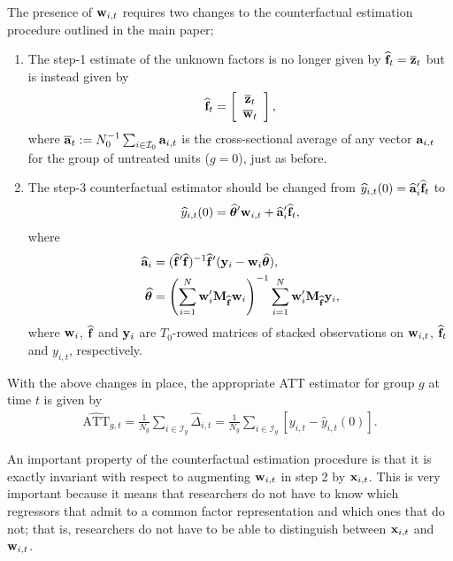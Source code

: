 \documentclass[12pt,fleqn]{article}
\begin{document}
The presence of $\mathbf{w}_{i,t}$ requires two changes to the counterfactual estimation procedure outlined in the main paper;
\begin{enumerate}
  \item The step-1 estimate of the unknown factors is no longer given by $\widehat{\mathbf{f}}_{t} = \overline{\mathbf{z}}_t$ but is instead given by
\begin{align}
\widehat{\mathbf{f}}_{t} = \left[ \begin{array}{c}
                         \overline{\mathbf{z}}_t \\
                         \overline{\mathbf{w}}_t
                          \end{array}
\right],
\end{align}
where $\overline{\mathbf{a}}_t := N_0^{-1}\sum_{i \in \mathcal{I}_0} \mathbf{a}_{i,t}$ is the cross-sectional average of any vector $\mathbf{a}_{i,t}$ for the group of untreated units ($g= 0$), just as before.

  \item The step-3 counterfactual estimator should be changed from $\widehat y_{i,t}(0) =  \widehat{\mathbf{a}}_{i}'\widehat{\mathbf{f}}_{t}$ to
\begin{align}
\widehat y_{i,t}(0) = \widehat{\boldsymbol{\theta}}'\mathbf{w}_{i,t} + \widehat{\mathbf{a}}_{i}'\widehat{\mathbf{f}}_{t},
\end{align}
where
\begin{align}
\widehat{\mathbf{a}}_{i} & =  (\widehat{\mathbf{f}}'\widehat{\mathbf{f}})^{-1}\widehat{\mathbf{f}}'(\mathbf{y}_{i} - \mathbf{w}_i\widehat{\boldsymbol{\theta}}) , \\
\widehat{\boldsymbol{\theta}} &= \left(\sum_{i=1}^N  \mathbf{w}_{i}'\mathbf{M}_{\widehat{\mathbf{f}}}\mathbf{w}_{i}\right)^{-1}\sum_{i=1}^N \mathbf{w}_{i}' \mathbf{M}_{\widehat{\mathbf{f}}}\mathbf{y}_{i},
\end{align}
where $\mathbf{w}_{i}$, $\widehat{\mathbf{f}}$ and $\mathbf{y}_{i}$ are $T_0$-rowed matrices of stacked observations on $\mathbf{w}_{i,t}$, $\widehat{\mathbf{f}}_{t}$ and $y_{i,t}$, respectively.
\end{enumerate}

With the above changes in place, the appropriate ATT estimator for group $g$ at time $t$ is given by
\begin{align}
\widehat{\mathrm{ATT}}_{g,t} = \frac{1}{N_g}\sum_{i \in \mathcal{I}_g} \widehat \Delta_{i,t}= \frac{1}{N_g}\sum_{i \in \mathcal{I}_g} [y_{i,t} - \widehat y_{i,t}(0)].
\end{align}

An important property of the counterfactual estimation procedure is that it is exactly invariant with respect to augmenting $\mathbf{w}_{i,t}$ in step 2 by $\mathbf{x}_{i,t}$. This is very important because it means that researchers do not have to know which regressors that admit to a common factor representation and which ones that do not; that is, researchers do not have to be able to distinguish between $\mathbf{x}_{i,t}$ and $\mathbf{w}_{i,t}$.
\end{document}
